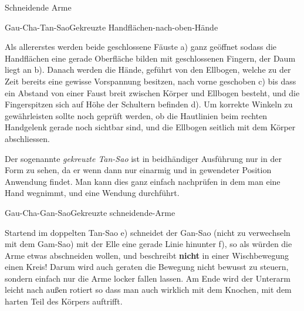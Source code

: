 \begin{WTSatz}{Schneidende Arme}%


	\begin{WTSatzTeil}{Gau-Cha-Tan-Sao}{Gekreuzte Handfl\"achen-nach-oben-H\"ande}
		
		Als allererstes werden beide geschlossene F\"auste a) ganz ge\"offnet sodass die Handfl\"achen eine gerade Oberfl\"ache bilden mit geschlossenen Fingern, der Daum liegt an b). Danach werden die H\"ande, gef\"uhrt von den Ellbogen, welche zu der Zeit bereits eine gewisse Vorspannung besitzen, nach vorne geschoben c) bis dass ein Abstand von einer Faust breit zwischen K\"orper und Ellbogen besteht, und die Fingerspitzen sich auf H\"ohe der Schultern befinden d). Um korrekte Winkeln zu gew\"ahrleisten sollte noch gepr\"uft werden, ob die Hautlinien beim rechten Handgelenk gerade noch sichtbar sind, und die Ellbogen seitlich mit dem K\"orper abschliessen.
	
		
		Der sogenannte \textit{gekreuzte Tan-Sao} ist in beidh\"andiger Ausf\"uhrung nur in der Form zu sehen, da er wenn dann nur einarmig und in gewendeter Position Anwendung findet. Man kann dies ganz einfach nachpr\"ufen in dem man eine Hand wegnimmt, und eine Wendung durchf\"uhrt.
		
	\end{WTSatzTeil}
	
	\begin{WTSatzTeil}{Gau-Cha-Gan-Sao}{Gekreuzte schneidende-Arme}
		
		Startend im doppelten Tan-Sao e) schneidet der Gan-Sao (nicht zu verwechseln mit dem Gam-Sao) mit der Elle eine gerade Linie hinunter f), so als w\"urden die Arme etwas abschneiden wollen, und beschreibt \textbf{nicht} in einer Wischbewegung einen Kreis! Darum wird auch geraten die Bewegung nicht bewusst zu steuern, sondern einfach nur die Arme locker fallen lassen. Am Ende wird der Unterarm leicht nach au{\ss}en rotiert so dass man auch wirklich mit dem Knochen, mit dem harten Teil des K\"orpers auftrifft.
	\end{WTSatzTeil}
	

\end{WTSatz}
